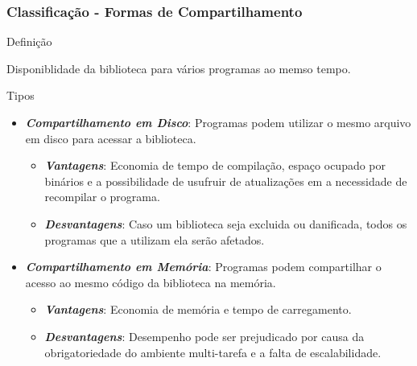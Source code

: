 \begin{frame}
 \frametitle{Classificação - Formas de Compartilhamento}
 
 \begin{block}{Definição}  
 
  Disponiblidade da biblioteca para vários programas ao memso tempo.
  
 \end{block}

 \begin{block}{Tipos}  
 
  \begin{itemize}
  
   \item \emph{\textbf{Compartilhamento em Disco}}: Programas podem utilizar o mesmo arquivo em disco para acessar a 
   biblioteca.  

   \begin{itemize}       
   
     \item \emph{\textbf{Vantagens}}: Economia de tempo de compilação, espaço ocupado por binários e a possibilidade 
     de usufruir de atualizações em a necessidade de recompilar o programa.
   
   
     \item \emph{\textbf{Desvantagens}}: Caso um biblioteca seja excluida ou danificada, todos os programas que a utilizam
     ela serão afetados.        
   
   \end{itemize}
   
   \item \emph{\textbf{Compartilhamento em Memória}}: Programas podem compartilhar o acesso ao mesmo 
   código da biblioteca na memória. 
   
   \begin{itemize}    
   
     \item \emph{\textbf{Vantagens}}: Economia de memória e tempo de carregamento.
   
   
     \item \emph{\textbf{Desvantagens}}: Desempenho pode ser prejudicado por causa da obrigatoriedade do ambiente 
     multi-tarefa e a falta de escalabilidade.
   
   
   \end{itemize}
   
  \end{itemize}

 \end{block}
 
 \end{frame}